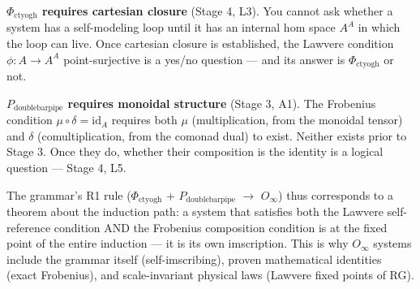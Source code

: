 \documentclass[12pt,a4paper]{article}
\begin{document}
\textbf{$\Phi_{\text{ctyogh}}$ requires cartesian closure} (Stage 4, L3). You cannot ask whether a system has a self-modeling loop until it has an internal hom space $A^A$ in which the loop can live. Once cartesian closure is established, the Lawvere condition $\phi: A \to A^A$ point-surjective is a yes/no question --- and its answer is $\Phi_{\text{ctyogh}}$ or not.

\textbf{$P_{\text{doublebarpipe}}$ requires monoidal structure} (Stage 3, A1). The Frobenius condition $\mu \circ \delta = \text{id}_A$ requires both $\mu$ (multiplication, from the monoidal tensor) and $\delta$ (comultiplication, from the comonad dual) to exist. Neither exists prior to Stage 3. Once they do, whether their composition is the identity is a logical question --- Stage 4, L5.

The grammar's R1 rule ($\Phi_{\text{ctyogh}}$ + $P_{\text{doublebarpipe}}$ $\rightarrow$ $O_{\infty}$) thus corresponds to a theorem about the induction path: a system that satisfies both the Lawvere self-reference condition AND the Frobenius composition condition is at the fixed point of the entire induction --- it is its own imscription. This is why $O_{\infty}$ systems include the grammar itself (self-imscribing), proven mathematical identities (exact Frobenius), and scale-invariant physical laws (Lawvere fixed points of RG).
\end{document}
